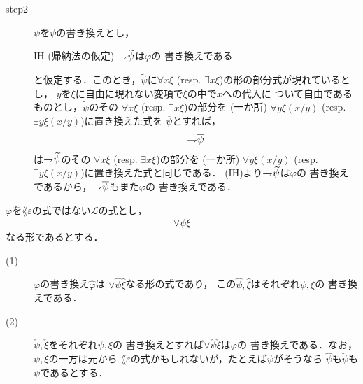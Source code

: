 \begin{metaprf}
\begin{description}
\begin{description}
					\item[step2]
						$\widetilde{\psi}$を$\psi$の書き換えとし，
						\begin{itembox}[l]{IH (帰納法の仮定)}
							$\rightharpoondown\hspace{-0.25em} \widetilde{\psi}$は$\varphi$の
							書き換えである
						\end{itembox}
						と仮定する．このとき，$\widetilde{\psi}$に$\forall x \xi$ 
						(resp. $\exists x \xi$)の形の部分式が現れているとし，
						$y$を$\xi$に自由に現れない変項で$\xi$の中で$x$への代入に
						ついて自由であるものとし，$\widetilde{\psi}$のその
						$\forall x \xi$ (resp. $\exists x \xi$)の部分を
						(一か所) $\forall y \xi(x/y)$
						(resp. $\exists y \xi(x/y)$)に置き換えた式を
						$\overline{\psi}$とすれば，
						\begin{align}
							\rightharpoondown\hspace{-0.25em} \overline{\psi}
						\end{align}
						は$\rightharpoondown\hspace{-0.25em} \widetilde{\psi}$のその
						$\forall x \xi$ (resp. $\exists x \xi$)の部分を
						(一か所) $\forall y \xi(x/y)$
						(resp. $\exists y \xi(x/y)$)に置き換えた式と同じである．
						(IH)より$\rightharpoondown\hspace{-0.25em} \widetilde{\psi}$は$\varphi$の
						書き換えであるから，$\rightharpoondown\hspace{-0.25em} \overline{\psi}$もまた$\varphi$の
						書き換えである．
						\QED
				\end{description}
		\end{description}
	\end{metaprf}
	
	\begin{screen}
		\begin{metathm}[部分式の書き換えとの関係2]
		\label{metathm:relation_to_subformula_rewriting_2}
			$\varphi$を$\lang{\varepsilon}$の式ではない$\mathcal{L}$の式とし，
			\begin{align}
				\vee \psi \xi
			\end{align}
			なる形であるとする．
			\begin{description}
				\item[(1)] $\varphi$の書き換え$\widehat{\varphi}$は
					$\vee \widehat{\psi} \widehat{\xi}$なる形の式であり，
					この$\widehat{\psi},\widehat{\xi}$はそれぞれ$\psi,\xi$の
					書き換えである．
					
				\item[(2)] $\check{\psi},\check{\xi}$をそれぞれ$\psi,\xi$の
					書き換えとすれば$\vee \check{\psi} \check{\xi}$は$\varphi$の
					書き換えである．なお，$\psi,\xi$の一方は元から
					$\lang{\varepsilon}$の式かもしれないが，たとえば$\psi$がそうなら
					$\widehat{\psi}$も$\check{\psi}$も$\psi$であるとする．
			\end{description}
		\end{metathm}
	\end{screen}
	
